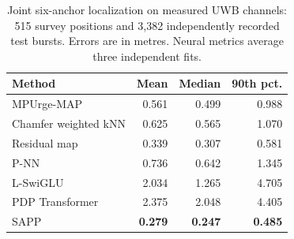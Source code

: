 \begin{table}[t]
\centering\small\setlength{\tabcolsep}{5pt}
\caption{Joint six-anchor localization on measured UWB channels: 515 survey positions and 3,382 independently recorded test bursts. Errors are in metres. Neural metrics average three independent fits.}
\label{tab:uwb}
\begin{tabular}{lrrr}
\toprule
Method & Mean & Median & 90th pct.\\
\midrule
MPUrge-MAP & 0.561 & 0.499 & 0.988\\
Chamfer weighted kNN & 0.625 & 0.565 & 1.070\\
Residual map & 0.339 & 0.307 & 0.581\\
P-NN & 0.736 & 0.642 & 1.345\\
L-SwiGLU & 2.034 & 1.265 & 4.705\\
PDP Transformer & 2.375 & 2.048 & 4.405\\
SAPP & \textbf{0.279} & \textbf{0.247} & \textbf{0.485}\\
\bottomrule
\end{tabular}
\end{table}
